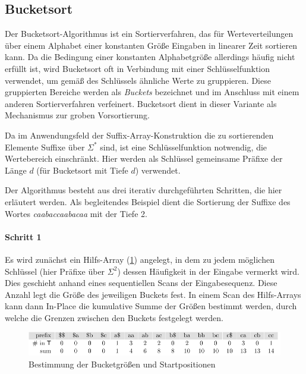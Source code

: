 \subsection{Bucketsort}
\label{section:bucketsort}

Der  Bucketsort-Algorithmus \cite[Kapitel 8.2 (dort unter dem Namen \emph{counting sort})]{Cormen2009} ist ein Sortierverfahren, das für Werteverteilungen über einem Alphabet einer konstanten Größe Eingaben in linearer Zeit sortieren kann. Da die Bedingung einer konstanten Alphabetgröße allerdings häufig nicht erfüllt ist, wird Bucketsort oft in Verbindung mit einer Schlüsselfunktion verwendet, um gemäß des Schlüssels \glqq ähnliche\grqq{} Werte zu gruppieren. Diese gruppierten Bereiche werden als \emph{Buckets} bezeichnet und im Anschluss mit einem anderen Sortierverfahren verfeinert. Bucketsort dient in dieser Variante als Mechanismus zur groben Vorsortierung.\par
Da im Anwendungsfeld der Suffix-Array-Konstruktion die zu sortierenden Elemente Suffixe über \(\Sigma^\ast\) sind, ist eine Schlüsselfunktion notwendig, die Wertebereich einschränkt. Hier werden als Schlüssel gemeinsame Präfixe der Länge \(d\) (für Bucketsort mit Tiefe \(d\)) verwendet.\par
Der Algorithmus besteht aus drei iterativ durchgeführten Schritten, die hier erläutert werden. Als begleitendes Beispiel dient die Sortierung der Suffixe des Wortes \emph{caabaccaabacaa} mit der Tiefe 2.
\paragraph{Schritt 1}
Es wird zunächst ein Hilfs-Array (\cref{bucketsort:bkt}) angelegt, in dem zu jedem möglichen Schlüssel (hier Präfixe über \(\Sigma^2\)) dessen Häufigkeit in der Eingabe vermerkt wird. Dies geschieht anhand eines sequentiellen Scans der Eingabesequenz. Diese Anzahl legt die Größe des jeweiligen Buckets fest. In einem Scan des Hilfs-Arrays kann dann In-Place die kumulative Summe der Größen bestimmt werden, durch welche die Grenzen zwischen den Buckets festgelegt werden.
\begin{figure}[ht]
    \includegraphics[width=\textwidth]{kapitel/4_komponenten/sortieralgorithmen/bucketsort/step_01/bkt/image.pdf}
    \caption{Bestimmung der Bucketgrößen und Startpositionen}
    \label{bucketsort:bkt}
\end{figure}
